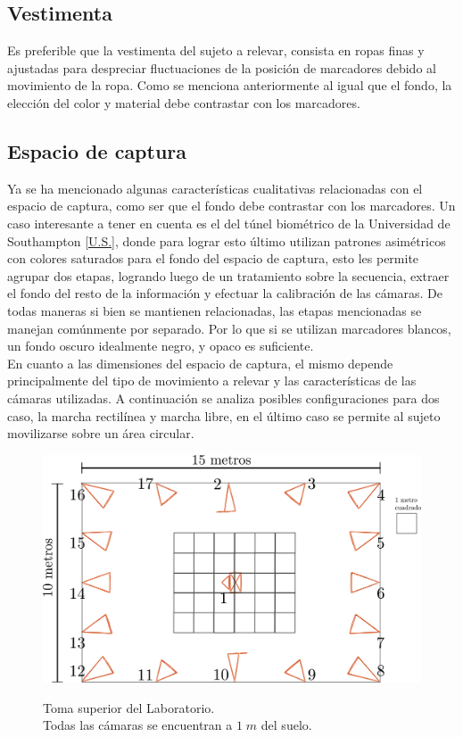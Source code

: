 \subsection{Vestimenta}
Es preferible que la vestimenta del sujeto a relevar, consista en ropas finas y ajustadas para despreciar fluctuaciones de la posición de marcadores debido al movimiento de la ropa. Como se menciona anteriormente al igual que el fondo, la elección del color y material debe contrastar con los marcadores.

\subsection{Espacio de captura}

Ya se ha mencionado algunas características cualitativas relacionadas con el espacio de captura, como ser que el fondo debe contrastar con los marcadores. Un caso interesante a tener en cuenta es el del túnel biométrico de la Universidad de Southampton \ref{U.S.}, donde para lograr esto último utilizan patrones asimétricos con colores saturados para el fondo del espacio de captura, esto les permite agrupar dos etapas, logrando luego de un tratamiento sobre la secuencia, extraer el fondo del resto de la información y efectuar la calibración de las cámaras. De todas maneras si bien se mantienen relacionadas, las etapas mencionadas se manejan comúnmente por separado. Por lo que si se utilizan marcadores blancos, un fondo oscuro idealmente negro, y opaco es suficiente.\\

En cuanto a las dimensiones del espacio de captura, el mismo depende principalmente del tipo de movimiento a relevar y las características de las cámaras utilizadas. A continuación se analiza posibles configuraciones para dos caso, la marcha rectilínea y marcha libre, en el último caso se permite al sujeto movilizarse sobre un área circular.


\begin{figure}[!ht]
  \centering
  {\includegraphics[scale=0.16]{img/Base_Datos/Laboratorio.pdf}}      
  \caption{Toma superior del Laboratorio.\\ Todas las cámaras se encuentran a $1\;m$ del suelo.}
  \label{img_Laboratorio}
\end{figure}  
 

